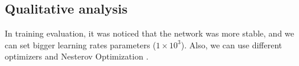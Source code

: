 \subsection{Qualitative analysis}

In training evaluation, it was noticed that the network was more stable, and we can set bigger learning rates parameters ($1 \times 10^3$). Also, we can use different optimizers and Nesterov Optimization \cite{Nesterov:1983wy}.


